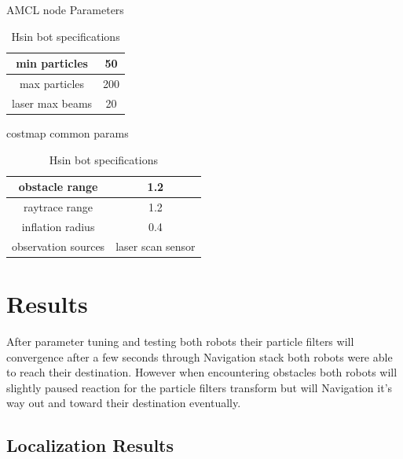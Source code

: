 \documentclass[10pt,journal,compsoc]{IEEEtran}
\begin{document}
\begin{table}[h]
 \begin{center}
       AMCL node Parameters\\
      \begin{tabular}{ |c|c| } 
       min particles & 50 \\
       \hline
       max particles & 200 \\
       \hline
       laser max beams & 20 \\
       \hline
      \end{tabular}
      \caption{Hsin bot specifications}
      \label{table:1}
      \end{center}
      \end{table}
\begin{table}[h]
 \begin{center}
 costmap common params\\
      \hline
      \begin{tabular}{ |c|c| }
       obstacle range & 1.2 \\
       \hline
       raytrace range & 1.2 \\
       \hline
       inflation radius & 0.4 \\
       \hline
       observation sources & laser scan sensor \\
       \hline
      \end{tabular}
      \caption{Hsin bot specifications}
      \label{table:1}
      \end{center}
      \end{table}  
    
\section{Results}
After parameter tuning and testing both robots their particle filters will convergence after a few seconds through Navigation stack both robots were able to reach their destination. However when encountering obstacles both robots will slightly paused reaction for the particle filters transform but will Navigation it's way out and toward their destination eventually.

\subsection{Localization Results}
\end{document}
